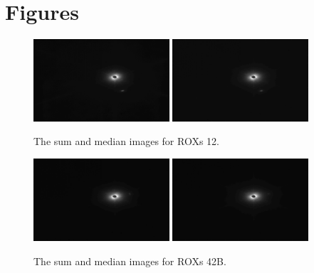 \documentclass[12pt]{article}
\begin{document}
\section*{Figures}
\begin{figure}[H]
\centering
\includegraphics[width=0.45\textwidth]{sum_12.png}
\includegraphics[width=0.45\textwidth]{med_12.png}
\vspace{-1em}
\caption{The sum and median images for ROXs 12.}
\end{figure}
\vspace{-1em}
\begin{figure}[H]
\centering
\includegraphics[width=0.45\textwidth]{sum_42b.png}
\includegraphics[width=0.45\textwidth]{med_42b.png}
\vspace{-1em}
\caption{The sum and median images for ROXs 42B.}
\end{figure}
\vspace{-1em}
\end{document}
